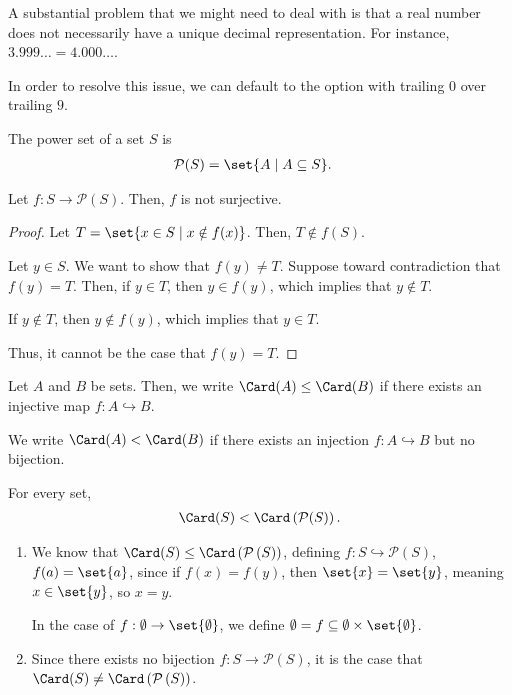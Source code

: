 \documentclass[10pt]{mypackage}
\begin{document}
\begin{note}
  A substantial problem that we might need to deal with is that a real number does not necessarily have a unique decimal representation. For instance, $3.999\dots = 4.000\dots$.\newline

  In order to resolve this issue, we can default to the option with trailing $0$ over trailing $9$.
\end{note}
\begin{definition}
The power set of a set $S$ is 
\begin{align*}
  \mathcal{P}(S) &= \set{A\mid A\subseteq S}.
\end{align*}
\end{definition}
\begin{theorem}
  Let $f: S\rightarrow \mathcal{P}\left(S\right)$. Then, $f$ is not surjective.
\end{theorem}
\begin{proof}
  Let $T = \set{x\in S\mid x\notin f(x)}$. Then, $T\notin f(S)$.\newline

  Let $y\in S$. We want to show that $f(y)\neq T$. Suppose toward contradiction that $f(y) = T$. Then, if $y\in T$, then $y\in f(y)$, which implies that $y\notin T$.\newline

  If $y\notin T$, then $y\notin f(y)$, which implies that $y\in T$.\newline

  Thus, it cannot be the case that $f(y) = T$.
\end{proof}
\begin{definition}
  Let $A$ and $B$ be sets. Then, we write $\Card(A) \leq \Card(B)$ if there exists an injective map $f: A\hookrightarrow B$.\newline

  We write $\Card(A) < \Card(B)$ if there exists an injection $f: A\hookrightarrow B$ but no bijection.
\end{definition}
\begin{example}
  For every set,
  \begin{align*}
    \Card(S) < \Card\left(\mathcal{P}(S)\right).
  \end{align*}
  \begin{enumerate}[(1)]
    \item We know that $\Card(S) \leq \Card\left(\mathcal{P}\left(S\right)\right)$, defining $f: S\hookrightarrow \mathcal{P}\left(S\right)$, $f(a) = \set{a}$, since if $f(x) = f(y)$, then $\set{x} = \set{y}$, meaning $x \in \set{y}$, so $x = y$.\newline

      In the case of $f: \emptyset \rightarrow \set{\emptyset}$, we define $\emptyset = f\subseteq \emptyset\times\set{\emptyset}$.
    \item Since there exists no bijection $f: S\rightarrow \mathcal{P}\left(S\right)$, it is the case that $\Card(S)\neq \Card\left(\mathcal{P}\left(S\right)\right)$.
  \end{enumerate}
\end{example}
\end{document}
